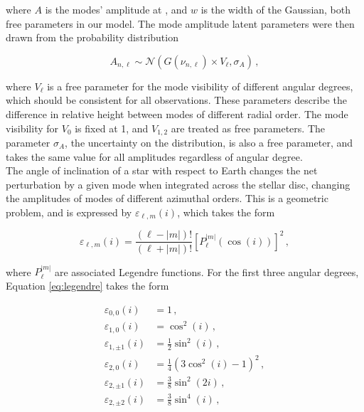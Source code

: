 \noindent where $A$ is the modes' amplitude at \numax, and $w$ is the width of the Gaussian, both free parameters in our model. 
The mode amplitude latent parameters were then drawn from the probability distribution

\begin{equation}\label{eq:amplitwod}
	A_{n, \ell} \sim \mathcal{N}(G(\nu_{n,\ell}) \times V_\ell, \sigma_{A})\, ,
\end{equation}

\noindent where $V_\ell$ is a free parameter for the mode visibility of different angular degrees, which should be consistent for all \kepler observations. These parameters describe the difference in relative height between modes of different radial order. The mode visibility for $V_0$ is fixed at 1, and $V_{1,2}$ are treated as free parameters. The parameter $\sigma_{A}$, the uncertainty on the distribution, is also a free parameter, and takes the same value for all amplitudes regardless of angular degree.\\

The angle of inclination of a star with respect to Earth changes the net perturbation by a given mode when integrated across the stellar disc, changing the amplitudes of modes of different azimuthal orders. This is a geometric problem, and is expressed by $\varepsilon_{\ell, m}(i)$, which takes the form \cite{gizon+solanki2003}

\begin{equation}\label{eq:legendre}
	\varepsilon_{\ell, m}(i) = \frac{(\ell - |m|)!}{(\ell + |m|)!}\left[P_\ell^{|m|}(\cos(i))\right]^2\, ,
\end{equation}

\noindent where $P_\ell^{|m|}$ are associated Legendre functions. For the first three angular degrees, Equation \ref{eq:legendre} takes the form \cite{handberg+campante2011}

\begin{equation}
	\begin{split}
		\varepsilon_{0,0}(i) &= 1\, ,\\
		\varepsilon_{1,0}(i) &= \cos^2(i)\, ,    \\
		\varepsilon_{1,\pm1}(i) &= \frac{1}{2}\sin^2(i)\, ,\\
		\varepsilon_{2,0}(i) &= \frac{1}{4}(3\cos^2(i) - 1)^2\, ,\\
		\varepsilon_{2,\pm1}(i) &= \frac{3}{8}\sin^2(2i)\, ,\\
		\varepsilon_{2,\pm2}(i) &= \frac{3}{8}\sin^4(i)\, ,
	\end{split}
\end{equation}

